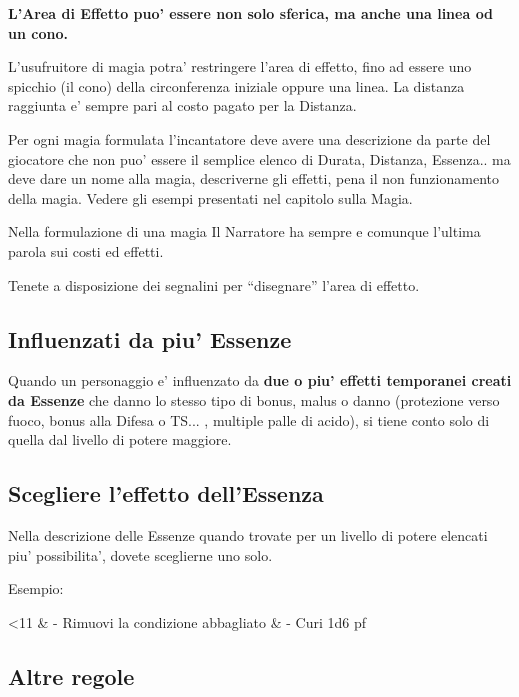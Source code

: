 \documentclass[a4paper,11pt,twoside,openany]{dndbook}
\begin{document}
\label{aree-di-effetto-diverse}

\textbf{L'Area di Effetto puo' essere non solo sferica, ma anche una linea od un cono.}

L'usufruitore di magia potra' restringere l'area di effetto, fino ad essere uno spicchio (il cono) della circonferenza iniziale oppure una linea. La distanza raggiunta e' sempre pari al costo pagato per la Distanza.

Per ogni magia formulata l'incantatore deve avere una descrizione da parte del giocatore che non puo' essere il semplice elenco di Durata, Distanza, Essenza.. ma deve dare un nome alla magia, descriverne gli effetti, pena il non funzionamento della magia. Vedere gli esempi presentati nel capitolo sulla Magia.

Nella formulazione di una magia Il Narratore ha sempre e comunque l'ultima parola sui costi ed effetti.

Tenete a disposizione dei segnalini per ``disegnare'' l'area di effetto.

\subsection{Influenzati da piu' Essenze}

\label{influenzati-da-piu-essenze}

Quando un personaggio e' influenzato da \textbf{due o piu' effetti temporanei creati da Essenze} che danno lo stesso tipo di bonus, malus o danno (protezione verso fuoco, bonus alla Difesa o TS... , multiple palle di acido), si tiene conto solo di quella dal livello di potere maggiore.

\subsection{Scegliere l'effetto dell'Essenza}

\label{scegliere-leffetto-dellessenza}

Nella descrizione delle Essenze quando trovate per un livello di potere elencati piu' possibilita', dovete sceglierne uno solo.

Esempio:

\begin{dndtable}[L{3.5cm} L{13cm}]
\toprule 
<11 & - Rimuovi la condizione abbagliato\tabularnewline
& - Curi 1d6 pf
\end{dndtable}

\subsection{Altre regole}
\end{document}
